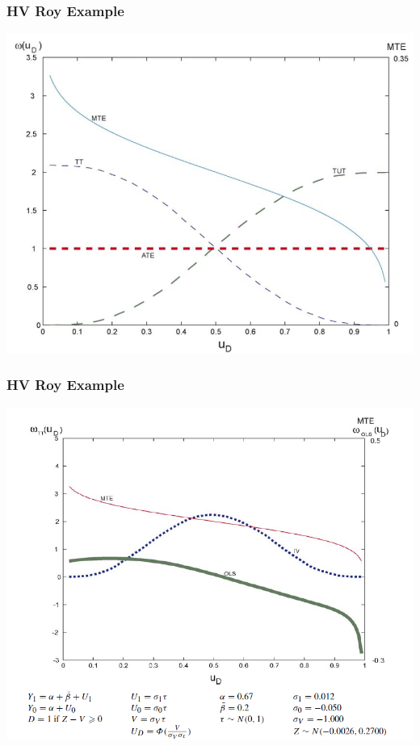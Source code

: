 \begin{frame}
  \frametitle{HV Roy Example}
  \begin{center}
    \includegraphics[width=.9\textwidth]{./resources/HVRoyTEs}
  \end{center}  
\end{frame}

\begin{frame}
  \frametitle{HV Roy Example}
  \vspace{-10pt}
  \begin{center}
    \includegraphics[width=\textwidth]{./resources/HVOLSIVexample}
  \end{center}  
\end{frame}

